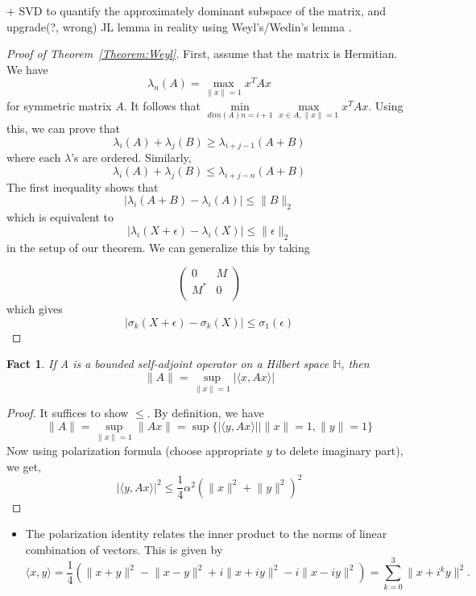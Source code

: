 \documentclass[11pt,reqno]{amsart}
\newtheorem{fact}{Fact}
\theoremstyle{remark}
\begin{document}
\begin{sloppypar}
\begin{itemize}
 + SVD to quantify the approximately dominant subspace of the matrix, and upgrade(?, wrong)
 JL lemma in reality using Weyl’s/Wedin's lemma .
\begin{proof}[Proof of Theorem~\ref{Theorem:Weyl}]
First, assume that the matrix is Hermitian. We have 
\[
\lambda_n(A)=\max_{\lVert x\rVert=1}x^TAx
\]
for symmetric matrix $A$.
 It follows that $\min\limits_{dim(A)n=i+1}\max\limits_{x\in A,
\lVert x\rVert=1}x^TAx$. Using this, we can prove that
\[
\lambda_i(A)+\lambda_j(B)\geq \lambda_{i+j-1}(A+B)
\] where each $\lambda$'s are ordered.
Similarly,
\[
\lambda_i(A)+\lambda_j(B)\leq \lambda_{i+j-n}(A+B)
\]
The first inequality shows that
\[
\lvert \lambda_i(A+B)-\lambda_i(A)\rvert\leq \lVert B\rVert_2
\]
which is equivalent to
\[
  \lvert \lambda_i(X+\epsilon)-\lambda_i(X)\rvert\leq \lVert \epsilon\rVert_2
\]
in the setup of our theorem.
We can generalize this by taking

\[
\begin{pmatrix}
  0 & M \\
  M^* & 0 \\
\end{pmatrix}
\]
which gives 
\[
\lvert \sigma_k(X+\epsilon)-\sigma_k(X)\rvert\leq\sigma_1(\epsilon)
\]
\end{proof}
\end{itemize}
\begin{fact}
If A is a bounded self-adjoint operator on a Hilbert space $\mathbb{H}$, then 
\[
\lVert A\rVert = \sup\limits_{\lVert x\rVert =1}\lvert\langle x, Ax\rangle\rvert
\]
\end{fact}
\begin{proof}
It suffices to show $\leq$. 
By definition, we have 
\[
\lVert A\rVert = \sup\limits_{\lVert x\rVert=1}\lVert Ax\rVert
=\sup\{\lvert\langle y, Ax\rangle\lvert\rvert\lVert x\rVert=1, \lVert
  y\rVert=1\}
\]
Now using polarization formula (choose appropriate $y$ to delete imaginary part), we get,
\[
\vert\langle y,Ax\rangle\lvert^2\leq \frac 14\alpha^2(\lVert x\rVert^2+\lVert y\rVert^2)^2
\]
\end{proof}
\begin{itemize}
\item The polarization identity relates the inner product to the norms of linear combination of vectors. This
 is given by
\[
\langle x, y\rangle = \frac 14(\lVert x+y\rVert^2-\lVert x-y\rVert^2+i\lVert x+iy\rVert^2-i\lVert x-iy\rVert^2)
=\sum\limits^3_{k=0}\lVert x+i^ky\rVert^2.
\]
\end{itemize}


\end{sloppypar}
\end{document}
